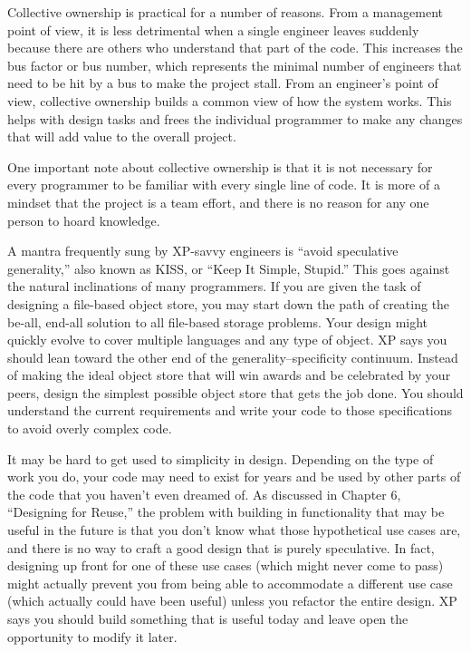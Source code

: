 Collective ownership is practical for a number of reasons. From a management point of view, it is less detrimental when a single engineer leaves suddenly because there are others who understand that part of the code. This increases the bus factor or bus number, which represents the minimal number of engineers that need to be hit by a bus to make the project stall. From an engineer’s point of view, collective ownership builds a common view of how the system works. This helps with design tasks and frees the individual programmer to make any changes that will add value to the overall project.

One important note about collective ownership is that it is not necessary for every programmer to be familiar with every single line of code. It is more of a mindset that the project is a team effort, and there is no reason for any one person to hoard knowledge.


A mantra frequently sung by XP-savvy engineers is “avoid speculative generality,” also known as KISS, or “Keep It Simple, Stupid.” This goes against the natural inclinations of many programmers. If you are given the task of designing a file-based object store, you may start down the path of creating the be-all, end-all solution to all file-based storage problems. Your design might quickly evolve to cover multiple languages and any type of object. XP says you should lean toward the other end of the generality–specificity continuum. Instead of making the ideal object store that will win awards and be celebrated by your peers, design the simplest possible object store that gets the job done. You should understand the current requirements and write your code to those specifications to avoid overly complex code.

It may be hard to get used to simplicity in design. Depending on the type of work you do, your code may need to exist for years and be used by other parts of the code that you haven’t even dreamed of. As discussed in Chapter 6, “Designing for Reuse,” the problem with building in functionality that may be useful in the future is that you don’t know what those hypothetical use cases are, and there is no way to craft a good design that is purely speculative. In fact, designing up front for one of these use cases (which might never come to pass) might actually prevent you from being able to accommodate a different use case (which actually could have been useful) unless you refactor the entire design. XP says you should build something that is useful today and leave open the opportunity to modify it later.

